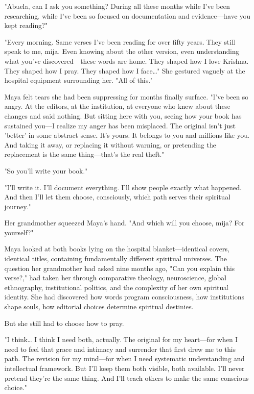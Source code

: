 \documentclass[12pt,twoside]{book}
\begin{document}
"Abuela, can I ask you something? During all these months while I've been researching, while I've been so focused on documentation and evidence—have you kept reading?"

"Every morning. Same verses I've been reading for over fifty years. They still speak to me, mija. Even knowing about the other version, even understanding what you've discovered—these words are home. They shaped how I love Krishna. They shaped how I pray. They shaped how I face\ldots{}" She gestured vaguely at the hospital equipment surrounding her. "All of this."

Maya felt tears she had been suppressing for months finally surface. "I've been so angry. At the editors, at the institution, at everyone who knew about these changes and said nothing. But sitting here with you, seeing how your book has sustained you—I realize my anger has been misplaced. The original isn't just 'better' in some abstract sense. It's yours. It belongs to you and millions like you. And taking it away, or replacing it without warning, or pretending the replacement is the same thing—that's the real theft."

"So you'll write your book."

"I'll write it. I'll document everything. I'll show people exactly what happened. And then I'll let them choose, consciously, which path serves their spiritual journey."

Her grandmother squeezed Maya's hand. "And which will you choose, mija? For yourself?"

Maya looked at both books lying on the hospital blanket—identical covers, identical titles, containing fundamentally different spiritual universes. The question her grandmother had asked nine months ago, "Can you explain this verse?," had taken her through comparative theology, neuroscience, global ethnography, institutional politics, and the complexity of her own spiritual identity. She had discovered how words program consciousness, how institutions shape souls, how editorial choices determine spiritual destinies.

But she still had to choose how to pray.

"I think\ldots{} I think I need both, actually. The original for my heart—for when I need to feel that grace and intimacy and surrender that first drew me to this path. The revision for my mind—for when I need systematic understanding and intellectual framework. But I'll keep them both visible, both available. I'll never pretend they're the same thing. And I'll teach others to make the same conscious choice."
\end{document}
